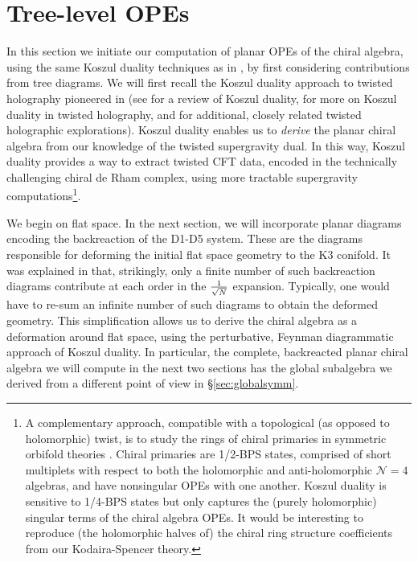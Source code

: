 \documentclass[../main.tex]{subfiles}
\begin{document}
\section{Tree-level OPEs}

In this section we initiate our computation of planar OPEs of the chiral algebra, using the same Koszul duality techniques as in \cite{CP}, by first considering contributions from tree diagrams. We will first recall the Koszul duality approach to twisted holography pioneered in \cite{CostelloM2, CP} (see \cite{PW} for a review of Koszul duality, \cite{Ishtiaque:2018str, Gaiotto:2019wcc, Oh:2020hph} for more on Koszul duality in twisted holography, and \cite{Mezei:2017kmw, Gaiotto:2020vqj,  Budzik:2021fyh, Oh:2021bwi} for additional, closely related twisted holographic explorations). Koszul duality enables us to \textit{derive} the planar chiral algebra from our knowledge of the twisted supergravity dual. In this way, Koszul duality provides a way to extract twisted CFT data, encoded in the technically challenging chiral de Rham complex, using more tractable supergravity computations\footnote{A complementary approach, compatible with a topological (as opposed to holomorphic) twist, is to study the rings of chiral primaries in symmetric orbifold theories \cite{Li:2020zwo, Ashok:2023mow, Ashok:2023kkd}. Chiral primaries are 1/2-BPS states, comprised of short multiplets with respect to both the holomorphic and anti-holomorphic $\mathcal{N}=4$ algebras, and have nonsingular OPEs with one another. Koszul duality is sensitive to 1/4-BPS states but only captures the (purely holomorphic) singular terms of the chiral algebra OPEs. It would be interesting to reproduce (the holomorphic halves of) the chiral ring structure coefficients from our Kodaira-Spencer theory.}. 

We begin on flat space. In the next section, we will incorporate planar diagrams encoding the backreaction of the D1-D5 system. These are the diagrams responsible for deforming the initial flat space geometry to the K3 conifold. It was explained in \cite{CP} that, strikingly, only a finite number of such backreaction diagrams contribute at each order in the ${1 \over \sqrt{N}}$ expansion. Typically, one would have to re-sum an infinite number of such diagrams to obtain the deformed geometry. This simplification allows us to derive the chiral algebra as a deformation around flat space, using the perturbative, Feynman diagrammatic approach of Koszul duality. In particular, the complete, backreacted planar chiral algebra we will compute in the next two sections has the global subalgebra we derived from a different point of view in \S \ref{sec:globalsymm}. 
\end{document}
